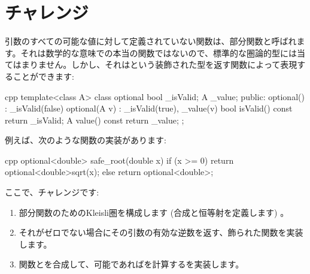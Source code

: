 \section{チャレンジ}

引数のすべての可能な値に対して定義されていない関数は、部分関数と呼ばれます。それは数学的な意味での本当の関数ではないので、標準的な圏論的型には当てはまりません。しかし、それはという装飾された型を返す関数によって表現することができます:

\begin{snip}{cpp}
template<class A> class optional {
    bool _isValid;
    A _value;
public: 
    optional()    : _isValid(false) {}
    optional(A v) : _isValid(true), _value(v) {}
    bool isValid() const { return _isValid; }
    A value() const { return _value; }
};
\end{snip}
例えば、次のような関数の実装があります:

\begin{snip}{cpp}
optional<double> safe_root(double x) {
    if (x >= 0) return optional<double>{sqrt(x)}; 
    else return optional<double>{};
}
\end{snip}
ここで、チャレンジです:

\begin{enumerate}
  \tightlist
  \item
        部分関数のためのKleisli圏を構成します (合成と恒等射を定義します) 。
  \item
        それがゼロでない場合にその引数の有効な逆数を返す、飾られた関数を実装します。
  \item
        関数とを合成して、可能であればを計算するを実装します。
\end{enumerate}